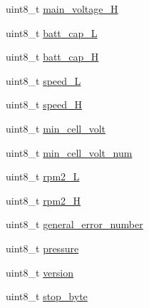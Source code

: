 \begin{DoxyCompactItemize}
\item 
uint8\+\_\+t \hyperlink{structHOTT__GAM__MSG__s_af30f87505cc69d0c5718dd168ef24662}{main\+\_\+voltage\+\_\+\+H}
\item 
uint8\+\_\+t \hyperlink{structHOTT__GAM__MSG__s_abd05fc10a5e386b2e1f7a5dced5505c4}{batt\+\_\+cap\+\_\+\+L}
\item 
uint8\+\_\+t \hyperlink{structHOTT__GAM__MSG__s_acd821900c7638101b2de1ab6af23259c}{batt\+\_\+cap\+\_\+\+H}
\item 
uint8\+\_\+t \hyperlink{structHOTT__GAM__MSG__s_a8b6e73a47bf4a88d210af15b169a94f6}{speed\+\_\+\+L}
\item 
uint8\+\_\+t \hyperlink{structHOTT__GAM__MSG__s_afd5ba3eaa12c5c49de63ce9b3c2b8dc1}{speed\+\_\+\+H}
\item 
uint8\+\_\+t \hyperlink{structHOTT__GAM__MSG__s_a3adb1ec3db57c235a05d74994d22c9d9}{min\+\_\+cell\+\_\+volt}
\item 
uint8\+\_\+t \hyperlink{structHOTT__GAM__MSG__s_a03bab70bab2dbb2c91b2985e90bdde7e}{min\+\_\+cell\+\_\+volt\+\_\+num}
\item 
uint8\+\_\+t \hyperlink{structHOTT__GAM__MSG__s_a7c6247a63b65011220474caccec449a1}{rpm2\+\_\+\+L}
\item 
uint8\+\_\+t \hyperlink{structHOTT__GAM__MSG__s_a18ef5608b301c5d0dae45057174c4275}{rpm2\+\_\+\+H}
\item 
uint8\+\_\+t \hyperlink{structHOTT__GAM__MSG__s_ae249f26fa67d8a3f2d849e435da715ab}{general\+\_\+error\+\_\+number}
\item 
uint8\+\_\+t \hyperlink{structHOTT__GAM__MSG__s_aede3589184852c0a15cc1eed92fd64ef}{pressure}
\item 
uint8\+\_\+t \hyperlink{structHOTT__GAM__MSG__s_a94c8789e70b59d6decfedeb63d83c20d}{version}
\item 
uint8\+\_\+t \hyperlink{structHOTT__GAM__MSG__s_a85b6b97c0f6eaa22c4dd485a3ad93c5a}{stop\+\_\+byte}
\end{DoxyCompactItemize}


